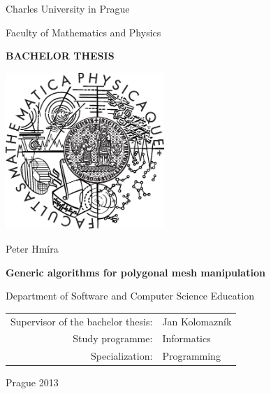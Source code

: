 \documentclass[12pt,a4paper]{report}
\begin{document}


\pagestyle{empty}
\begin{center}

\large

Charles University in Prague

\medskip

Faculty of Mathematics and Physics

\vfill

{\bf\Large BACHELOR THESIS}

\vfill

\centerline{\mbox{\includegraphics[width=60mm]{../img/logo.eps}}}

\vfill
\vspace{5mm}

{\LARGE Peter Hm\'{i}ra}

\vspace{15mm}

{\LARGE\bfseries Generic algorithms for polygonal mesh manipulation}

\vfill

Department of Software and Computer Science Education

\vfill

\begin{tabular}{rl}

Supervisor of the bachelor thesis: & Jan Kolomazník \\
\noalign{\vspace{2mm}}
Study programme: & Informatics \\
\noalign{\vspace{2mm}}
Specialization: & Programming \\
\end{tabular}

\vfill

Prague 2013

\end{center}
\end{document}

